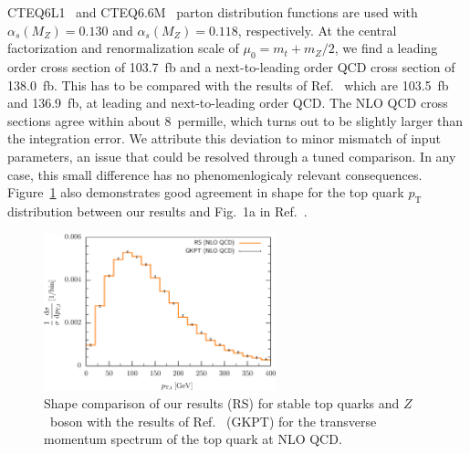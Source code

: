 \documentclass[preprint]{JHEP3}
\begin{document}
CTEQ6L1~\cite{Pumplin:2002vw} and CTEQ6.6M~\cite{Nadolsky:2008zw} parton distribution functions are used with $\alpha_s(M_Z)=0.130$ and $\alpha_s(M_Z)=0.118$, respectively. 
At the central factorization and renormalization scale of $\mu_0=m_t+m_Z/2$, 
we find a leading order cross section of 103.7~fb and a next-to-leading order QCD cross section of 138.0~fb. 
This has to be compared with the results of Ref.~\cite{Garzelli:2012bn} which are 103.5~fb and 136.9~fb, at leading and next-to-leading order QCD.
The NLO QCD cross sections agree within about 8~permille, which turns out to be slightly larger than the integration error.
We attribute this deviation to minor mismatch of input parameters, an issue that could be resolved through a tuned comparison.  
In any case, this small difference has no phenomenlogicaly relevant consequences.
Figure~\ref{fig:i} also demonstrates good agreement in shape for the top quark $p_{\mathrm{T}}$ distribution between our results and Fig.~1a in Ref.~\cite{Garzelli:2012bn}.
\begin{figure}[t]
\centering %
\includegraphics[width=0.6\textwidth]{./Troc_pTtop.eps}
\caption{\label{fig:i} Shape comparison of our results (RS) for stable top quarks and $Z$~boson with the results of Ref.~\cite{Garzelli:2012bn} (GKPT) for 
the transverse momentum spectrum of the top quark at NLO QCD. 
}
\end{figure}
\end{document}
